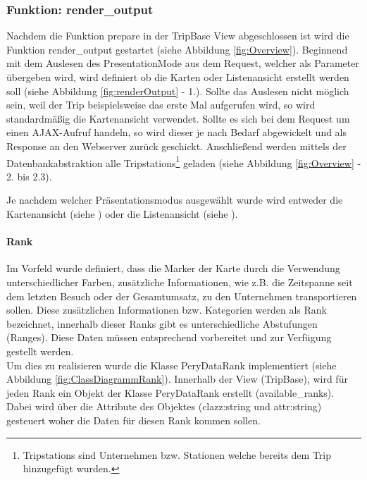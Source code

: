 \documentclass[Bachelorarbeit.tex]{subfiles}
\begin{document}
\subsubsection*{Funktion: render\_output}
\label{renderOutput}
Nachdem die Funktion prepare in der TripBase View abgeschlossen ist wird die Funktion render\_output gestartet (siehe Abbildung \ref{fig:Overview}).
Beginnend mit dem Auslesen des PresentationMode aus dem Request, welcher als Parameter übergeben wird, wird definiert ob die Karten oder Listenansicht erstellt werden soll (siehe Abbildung \ref{fig:renderOutput} - 1.).
Sollte das Auslesen nicht möglich sein, weil der Trip beispielsweise das erste Mal aufgerufen wird, so wird standardmäßig die Kartenansicht verwendet.
Sollte es sich bei dem Request um einen \ac{AJAX}-Aufruf handeln, so wird dieser je nach Bedarf abgewickelt und als Response an den Webserver zurück geschickt.
Anschließend werden mittels der Datenbankabstraktion alle Tripstations\footnote{Tripstations sind Unternehmen bzw. Stationen welche bereits dem Trip hinzugefügt wurden.} geladen (siehe Abbildung \ref{fig:Overview} - 2. bis 2.3).

Je nachdem welcher Präsentationsmodus ausgewählt wurde wird entweder die Kartenansicht (siehe ) oder die Listenansicht (siehe ).

\paragraph{Rank}
\label{Rank}
Im Vorfeld wurde definiert, dass die Marker der Karte durch die Verwendung unterschiedlicher Farben, zusätzliche Informationen, wie z.B. die Zeitspanne seit dem letzten Besuch oder der Gesamtumsatz, zu den Unternehmen transportieren sollen. Diese zusätzlichen Informationen bzw. Kategorien werden als Rank bezeichnet, innerhalb dieser Ranks gibt es unterschiedliche Abstufungen (Ranges).
Diese Daten müssen entsprechend vorbereitet und zur Verfügung gestellt werden.
\\
Um dies zu realisieren wurde die Klasse PeryDataRank implementiert (siehe Abbildung \ref{fig:ClassDiagrammRank}). 
Innerhalb der View (TripBase), wird für jeden Rank ein Objekt der Klasse PeryDataRank erstellt (available\_ranks).
Dabei wird über die Attribute des Objektes (clazz:string und attr:string) gesteuert woher die Daten für diesen Rank kommen sollen. \\
\end{document}
